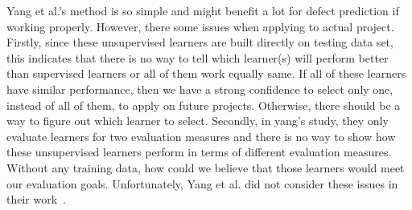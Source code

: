 Yang et al.'s method is so simple and might benefit a lot for defect prediction if working properly. However, there some issues
when applying to actual project. Firstly, since these unsupervised learners are built directly on testing data set, this indicates that there is no way to tell which learner(s) will perform better than supervised learners or all of them work equally same. 
If all of these learners have similar performance, then we have a strong confidence to select only one, instead of all of them, to apply on future projects. Otherwise, there should be a way to figure out which learner to select. Secondly, in yang's study, they only evaluate learners for two evaluation measures and there is no way to show how these unsupervised
learners perform in terms of different evaluation measures. Without any training data, how could we believe that those learners would meet our evaluation goals. Unfortunately, Yang et al. did not consider these issues in their work~\cite{yang2016effort}. 







